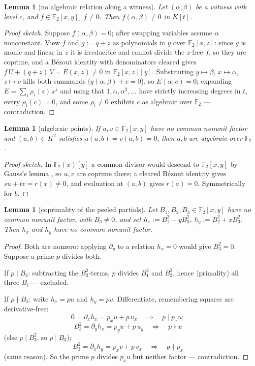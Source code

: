 \documentclass[11pt]{article}
\newtheorem{lemma}[theorem]{Lemma}
\theoremstyle{definition}
\newcommand{\F}{\mathbb{F}}
\begin{document}
\begin{lemma}[no algebraic relation along a witness]\label{lem:kill}
Let $(\alpha,\beta)$ be a witness with level $c$, and
$f \in \F_2[x,y]$, $f \neq 0$.  Then $f(\alpha,\beta) \neq 0$ in
$K[t]$.
\end{lemma}

\begin{proof}[Proof sketch]
Suppose $f(\alpha,\beta) = 0$; after swapping variables assume
$\alpha$ nonconstant.  View $f$ and $g := q + z$ as polynomials in
$y$ over $\F_2[x,z]$: since $g$ is monic and linear in $z$ it is
irreducible and cannot divide the $z$-free $f$, so they are coprime,
and a B\'ezout identity with denominators cleared gives
$f\,U + (q + z)\,V = E(x, z) \neq 0$ in $\F_2[x,z][y]$.
Substituting $y \mapsto \beta$, $x \mapsto \alpha$, $z \mapsto c$
kills both summands ($q(\alpha,\beta) + c = 0$), so
$E(\alpha, c) = 0$; expanding $E = \sum_i \rho_i(z)\,x^i$ and using
that $1, \alpha, \alpha^2, \dots$ have strictly increasing degrees in
$t$, every $\rho_i(c) = 0$, and some $\rho_i \neq 0$ exhibits $c$ as
algebraic over $\F_2$ --- contradiction.
\end{proof}

\begin{lemma}[algebraic points]\label{lem:algpoint}
If $u, v \in \F_2[x,y]$ have no common nonunit factor and
$(a,b) \in K^2$ satisfies $u(a,b) = v(a,b) = 0$, then $a, b$ are
algebraic over $\F_2$.
\end{lemma}

\begin{proof}[Proof sketch]
In $\F_2(x)[y]$ a common divisor would descend to $\F_2[x,y]$ by
Gauss's lemma \cite[Ch.~IV]{Lang}, so $u, v$ are coprime there; a
cleared B\'ezout identity gives $su + tv = r(x) \neq 0$, and
evaluation at $(a,b)$ gives $r(a) = 0$.  Symmetrically for $b$.
\end{proof}

\begin{lemma}[coprimality of the peeled partials]\label{lem:keystone}
Let $B_1, B_2, B_3 \in \F_2[x,y]$ have no common nonunit factor, with
$B_3 \neq 0$, and set $h_x := B_1^2 + y B_3^2$,
$h_y := B_2^2 + x B_3^2$.  Then $h_x$ and $h_y$ have no common
nonunit factor.
\end{lemma}

\begin{proof}
Both are nonzero: applying $\partial_y$ to a relation $h_x = 0$ would
give $B_3^2 = 0$.  Suppose a prime $p$ divides both.

If $p \mid B_3$: subtracting the $B_3^2$-terms, $p$ divides $B_1^2$
and $B_2^2$, hence (primality) all three $B_i$ --- excluded.

If $p \nmid B_3$: write $h_x = p u$ and $h_y = p v$.  Differentiate,
remembering squares are derivative-free:
\[
  0 = \partial_x h_x = p_x u + p\, u_x
  \quad\Longrightarrow\quad p \mid p_x u ;
\]
\[
  B_3^2 = \partial_y h_x = p_y u + p\, u_y
  \quad\Longrightarrow\quad p \nmid u
\]
(else $p \mid B_3^2$, so $p \mid B_3$);
\[
  B_3^2 = \partial_x h_y = p_x v + p\, v_x
  \quad\Longrightarrow\quad p \nmid p_x
\]
(same reason).  So the prime $p$ divides $p_x u$ but neither factor
--- contradiction.
\end{proof}
\end{document}
